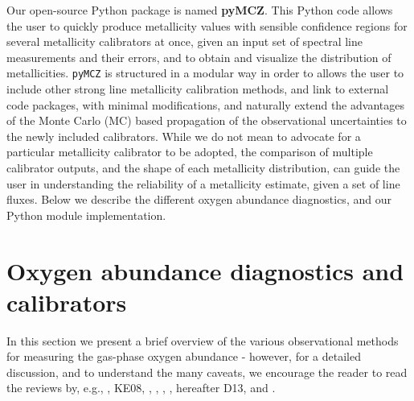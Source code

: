 \documentclass{emulateapj} \usepackage{amsmath} \usepackage{float}
\begin{document}
Our open-source Python package is named \textbf{pyMCZ}.  This Python
code allows the user to quickly produce metallicity values with
sensible confidence regions for several metallicity calibrators at
once, given an input set of spectral line measurements and their
errors, and to obtain and visualize the distribution of metallicities.
\verb=pyMCZ= is structured in a modular way in order to allows the
user to include other strong line metallicity calibration methods, and
link to external code packages, with minimal modifications, and
naturally extend the advantages of the Monte Carlo (MC) based propagation of
the observational uncertainties to the newly included calibrators.
While we do not mean to advocate for a
particular metallicity calibrator to be adopted, the comparison of
multiple calibrator outputs, and the shape of each metallicity
distribution, can guide the user in understanding the reliability of a
metallicity estimate, given a set of line fluxes.
Below we describe the different oxygen abundance diagnostics, and our
Python module implementation. 

\section{Oxygen abundance diagnostics and calibrators}\label{sec: diags}

In this section we present a brief overview of the various
observational methods for measuring the gas-phase oxygen abundance -
however, for a detailed discussion, and to understand the many caveats,
we encourage the reader to read the reviews by, e.g.,
\citet{stasinska02}, KE08, \citet{moustakas10},
\citet{stasinska10}, \citet{lopezsanchez12}, \citet{dopita13}, hereafter D13, and
\citet{blanc15}.  
\end{document}
